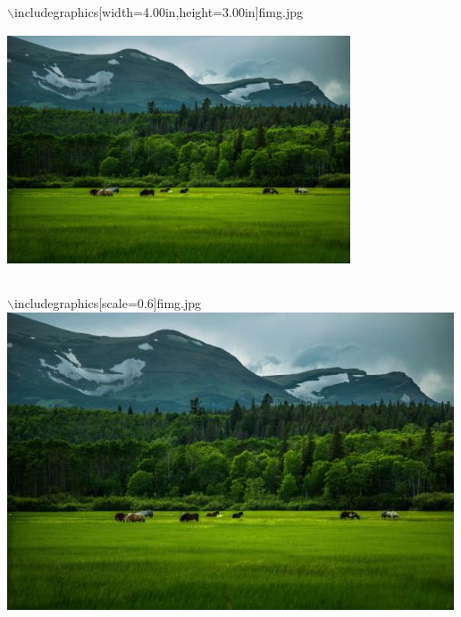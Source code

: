 \documentclass{article}
\begin{document}
$\backslash$includegraphics[width=4.00in,height=3.00in]{fimg.jpg}
\includegraphics[width=4.00in,height=3.00in]{fimg.jpg}

$\backslash$includegraphics[scale=0.6]{fimg.jpg}
\includegraphics[scale=0.6]{fimg.jpg}
\end{document}
